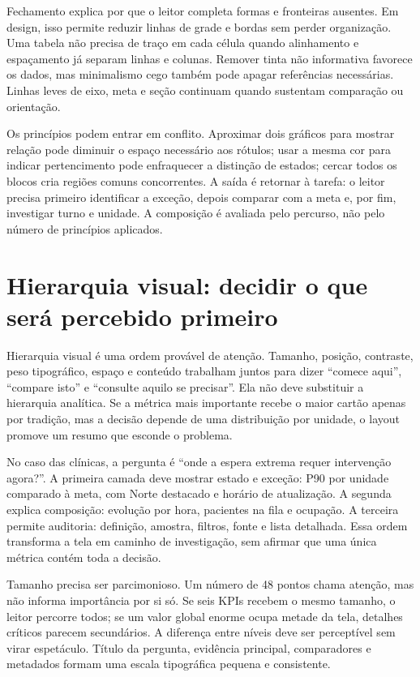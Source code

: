 Fechamento explica por que o leitor completa formas e fronteiras ausentes. Em design, isso permite reduzir linhas de grade e bordas sem perder organização. Uma tabela não precisa de traço em cada célula quando alinhamento e espaçamento já separam linhas e colunas. Remover tinta não informativa favorece os dados, mas minimalismo cego também pode apagar referências necessárias. Linhas leves de eixo, meta e seção continuam quando sustentam comparação ou orientação.

Os princípios podem entrar em conflito. Aproximar dois gráficos para mostrar relação pode diminuir o espaço necessário aos rótulos; usar a mesma cor para indicar pertencimento pode enfraquecer a distinção de estados; cercar todos os blocos cria regiões comuns concorrentes. A saída é retornar à tarefa: o leitor precisa primeiro identificar a exceção, depois comparar com a meta e, por fim, investigar turno e unidade. A composição é avaliada pelo percurso, não pelo número de princípios aplicados.

\section{Hierarquia visual: decidir o que será percebido primeiro}

Hierarquia visual é uma ordem provável de atenção. Tamanho, posição, contraste, peso tipográfico, espaço e conteúdo trabalham juntos para dizer ``comece aqui'', ``compare isto'' e ``consulte aquilo se precisar''. Ela não deve substituir a hierarquia analítica. Se a métrica mais importante recebe o maior cartão apenas por tradição, mas a decisão depende de uma distribuição por unidade, o layout promove um resumo que esconde o problema.

No caso das clínicas, a pergunta é ``onde a espera extrema requer intervenção agora?''. A primeira camada deve mostrar estado e exceção: P90 por unidade comparado à meta, com Norte destacado e horário de atualização. A segunda explica composição: evolução por hora, pacientes na fila e ocupação. A terceira permite auditoria: definição, amostra, filtros, fonte e lista detalhada. Essa ordem transforma a tela em caminho de investigação, sem afirmar que uma única métrica contém toda a decisão.

Tamanho precisa ser parcimonioso. Um número de 48 pontos chama atenção, mas não informa importância por si só. Se seis KPIs recebem o mesmo tamanho, o leitor percorre todos; se um valor global enorme ocupa metade da tela, detalhes críticos parecem secundários. A diferença entre níveis deve ser perceptível sem virar espetáculo. Título da pergunta, evidência principal, comparadores e metadados formam uma escala tipográfica pequena e consistente.

